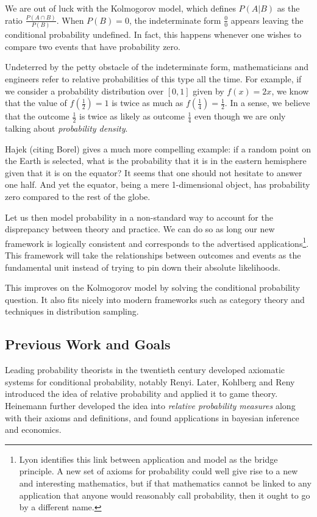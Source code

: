 \documentclass[twoside]{article}
\theoremstyle{plain}%
\theoremstyle{definition}
\theoremstyle{remark}
\begin{document}
We are out of luck with the Kolmogorov model, which defines \(P(A|B)\) as the ratio \(\frac{P(A \cap B)}{P(B)}\). When \(P(B) = 0\), the indeterminate form \(\frac{0}{0}\) appears leaving the conditional probability undefined. In fact, this happens whenever one wishes to compare two events that have probability zero.

Undeterred by the petty obstacle of the indeterminate form, mathematicians and engineers refer to relative probabilities of this type all the time. For example, if we consider a probability distribution over \([0, 1]\) given by \(f(x) = 2x\), we know that the value of \(f(\frac{1}{2}) = 1\) is twice as much as \(f(\frac{1}{4}) = \frac{1}{2}\). In a sense, we believe that the outcome \(\frac{1}{2}\)  is twice as likely as outcome \(\frac{1}{4}\) even though we are only talking about \textit{probability density}.

Hajek\cite{hajek} (citing Borel) gives a much more compelling example: if a random point on the Earth is selected, what is the probability that it is in the eastern hemisphere given that it is on the equator? It seems that one should not hesitate to answer one half. And yet the equator, being a mere 1-dimensional object, has probability zero compared to the rest of the globe.

Let us then model probability in a non-standard way to account for the disprepancy between theory and practice. We can do so as long our new framework is logically consistent and corresponds to the advertised applications\footnote{Lyon identifies this link between application and model as the bridge principle. A new set of axioms for probability could well give rise to a new and interesting mathematics, but if that mathematics cannot be linked to any application that anyone would reasonably call probability, then it ought to go by a different name.}. This framework will take the relationships between outcomes and events as the fundamental unit instead of trying to pin down their absolute likelihoods.

This improves on the Kolmogorov model by solving the conditional probability question. It also fits nicely into modern frameworks such as category theory and techniques in distribution sampling.

\subsection{Previous Work and Goals}

Leading probability theorists in the twentieth century developed axiomatic systems for conditional probability, notably Renyi\cite{renyi}. Later, Kohlberg and Reny\cite{kohlberg} introduced the idea of relative probability and applied it to game theory. Heinemann\cite{heinemann} further developed the idea into \textit{relative probability measures} along with their axioms and definitions, and found applications in bayesian inference and economics\cite{heinemann_econ}.
\end{document}
